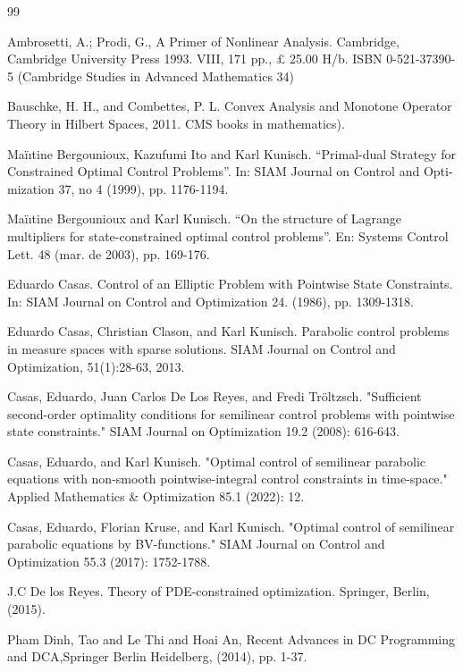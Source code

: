 \documentclass[11pt,a4paper]{amsart}
\begin{document}
\begin{thebibliography}{99}

Ambrosetti, A.; Prodi, G., A Primer of Nonlinear Analysis. Cambridge, Cambridge University Press 1993. VIII, 171 pp., £ 25.00 H/b. ISBN 0-521-37390-5 (Cambridge Studies in Advanced Mathematics 34)

Bauschke, H. H., and Combettes, P. L. Convex Analysis and Monotone Operator Theory in Hilbert Spaces, 2011. CMS books in mathematics).

Maïıtine Bergounioux, Kazufumi Ito and Karl Kunisch. “Primal-dual Strategy for Constrained Optimal Control Problems”. In: SIAM Journal on Control and Opti- mization 37, no 4 (1999), pp. 1176-1194.

Maïıtine Bergounioux and Karl Kunisch. “On the structure of Lagrange multipliers for state-constrained optimal control problems”. En: Systems Control Lett. 48 (mar. de
2003), pp. 169-176.

Eduardo Casas. Control of an Elliptic Problem with Pointwise State Constraints. In: SIAM Journal on Control and Optimization 24. (1986), pp. 1309-1318.

Eduardo Casas, Christian Clason, and Karl Kunisch. Parabolic control problems in measure spaces
with sparse solutions. SIAM Journal on Control and Optimization, 51(1):28-63, 2013.

Casas, Eduardo, Juan Carlos De Los Reyes, and Fredi Tröltzsch. "Sufficient second-order optimality conditions for semilinear control problems with pointwise state constraints." SIAM Journal on Optimization 19.2 (2008): 616-643.

Casas, Eduardo, and Karl Kunisch. "Optimal control of semilinear parabolic equations with non-smooth pointwise-integral control constraints in time-space." Applied Mathematics \& Optimization 85.1 (2022): 12.

Casas, Eduardo, Florian Kruse, and Karl Kunisch. "Optimal control of semilinear parabolic equations by BV-functions." SIAM Journal on Control and Optimization 55.3 (2017): 1752-1788.



J.C De los Reyes. Theory of PDE-constrained optimization. Springer, Berlin, (2015).

Pham Dinh, Tao and Le Thi and  Hoai An, Recent Advances in DC Programming and DCA,Springer Berlin Heidelberg, (2014), pp. 1-37.


\end{thebibliography}
\end{document}
